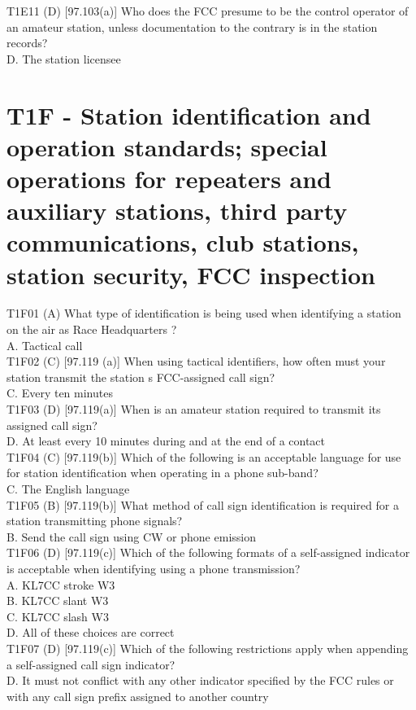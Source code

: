 \documentclass[12pt,letterpaper]{report}
\begin{document}
T1E11 (D) [97.103(a)] Who does the FCC presume to be the control operator of an amateur station, unless documentation to the contrary is in the station records?\\
D. The station licensee\\

\section{T1F - Station identification and operation standards; special operations for repeaters and auxiliary stations, third party communications, club stations, station security, FCC inspection}

T1F01 (A) What type of identification is being used when identifying a station on the air as  Race Headquarters ?\\
A. Tactical call\\

T1F02 (C) [97.119 (a)] When using tactical identifiers, how often must your station transmit the station s FCC-assigned call sign? \\
C. Every ten minutes\\

T1F03 (D) [97.119(a)] When is an amateur station required to transmit its assigned call sign?\\
D. At least every 10 minutes during and at the end of a contact\\

T1F04 (C) [97.119(b)] Which of the following is an acceptable language for use for station identification when operating in a phone sub-band?\\
C. The English language\\

T1F05 (B) [97.119(b)] What method of call sign identification is required for a station transmitting phone signals?\\
B. Send the call sign using CW or phone emission\\

T1F06 (D) [97.119(c)] Which of the following formats of a self-assigned indicator is acceptable when identifying using a phone transmission?\\
A. KL7CC stroke W3\\
B. KL7CC slant W3\\
C. KL7CC slash W3\\
D. All of these choices are correct\\

T1F07 (D) [97.119(c)] Which of the following restrictions apply when appending a self-assigned call sign indicator?\\
D. It must not conflict with any other indicator specified by the FCC rules or with any call sign prefix assigned to another country\\
\end{document}
